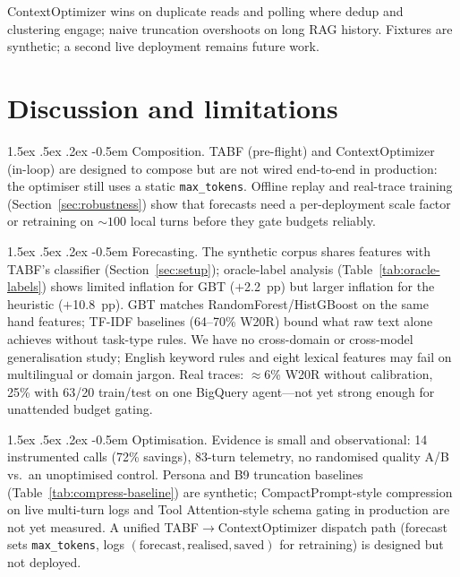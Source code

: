 \documentclass{article}
\makeatletter
\newcommand{\code}[1]{\texttt{\small #1}}
\renewcommand\paragraph{%
  \@startsection{paragraph}{4}{\z@}%
    {1.5ex \@plus.5ex \@minus.2ex}%
    {-0.5em}%
    {\normalfont\normalsize\bfseries}%
}
\makeatother
\begin{document}
ContextOptimizer wins on duplicate reads and polling where dedup and
clustering engage; naive truncation overshoots on long RAG history.
Fixtures are synthetic; a second live deployment remains future work.

\FloatBarrier
\section{Discussion and limitations}
\label{sec:discussion}

\paragraph{Composition.}
TABF (pre-flight) and ContextOptimizer (in-loop) are designed to compose
but are not wired end-to-end in production: the optimiser still uses a
static \code{max\_tokens}. Offline replay and real-trace training
(Section~\ref{sec:robustness}) show that forecasts need a per-deployment
scale factor or retraining on ${\sim}100$ local turns before they gate
budgets reliably.

\paragraph{Forecasting.}
The synthetic corpus shares features with TABF's classifier
(Section~\ref{sec:setup}); oracle-label analysis (Table~\ref{tab:oracle-labels})
shows limited inflation for GBT ($+$2.2~pp) but larger inflation for the
heuristic ($+$10.8~pp). GBT matches RandomForest/HistGBoost on the same
hand features; TF-IDF baselines (64--70\% W20R) bound what raw text alone
achieves without task-type rules. We have no cross-domain or cross-model
generalisation study; English keyword rules and eight lexical features may
fail on multilingual or domain jargon. Real traces: ${\approx}$6\% W20R
without calibration, 25\% with 63/20 train/test on one BigQuery agent---not
yet strong enough for unattended budget gating.

\paragraph{Optimisation.}
Evidence is small and observational: 14 instrumented calls (72\% savings),
83-turn telemetry, no randomised quality A/B vs.\ an unoptimised control.
Persona and B9 truncation baselines (Table~\ref{tab:compress-baseline}) are
synthetic; CompactPrompt-style compression on live multi-turn logs and Tool
Attention-style schema gating in production are not yet measured. A unified
TABF$\to$ContextOptimizer dispatch path (forecast sets \code{max\_tokens},
logs $(\text{forecast},\text{realised},\text{saved})$ for retraining) is
designed but not deployed.
\end{document}
